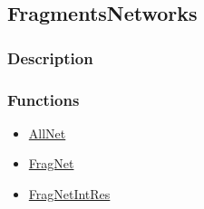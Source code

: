 \subsection{FragmentsNetworks}\label{FragmentsNetworks}
\subsubsection{Description}


\subsubsection{Functions}
\begin{itemize}
\item \hyperref[AllNet]{AllNet}
\item \hyperref[FragNet]{FragNet}	
\item \hyperref[FragNetIntRes]{FragNetIntRes}	
\end{itemize}

